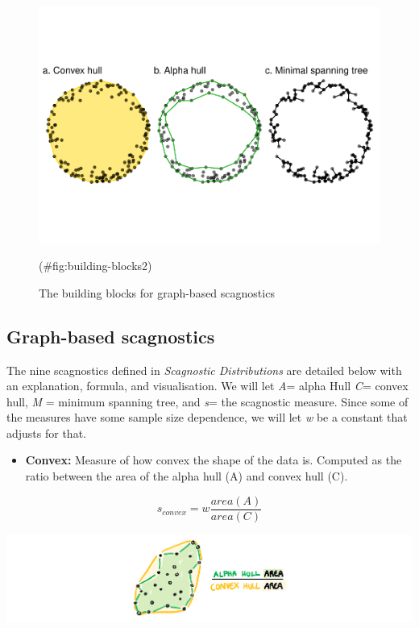 \begin{Schunk}
\begin{figure}
\includegraphics[width=1\linewidth]{mason-lee-laa-cook_files/figure-latex/building-blocks2-1} \caption[The building blocks for graph-based scagnostics]{The building blocks for graph-based scagnostics}(\#fig:building-blocks2)
\end{figure}
\end{Schunk}

\hypertarget{graph-based-scagnostics}{%
\subsection{Graph-based scagnostics}\label{graph-based-scagnostics}}

The nine scagnostics defined in \emph{Scagnostic Distributions} are
detailed below with an explanation, formula, and visualisation. We will
let \emph{A}= alpha Hull \emph{C}= convex hull, \emph{M} = minimum
spanning tree, and \emph{s}= the scagnostic measure. Since some of the
measures have some sample size dependence, we will let \emph{w} be a
constant that adjusts for that.

\begin{itemize}
\tightlist
\item
  \textbf{Convex:} Measure of how convex the shape of the data is.
  Computed as the ratio between the area of the alpha hull (A) and
  convex hull (C).
\end{itemize}

\[s_{convex}=w\frac{area(A)}{area(C)}\]

\includegraphics{figures/drawconvex.png}

